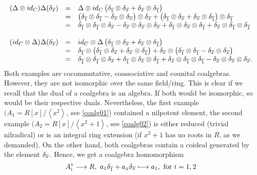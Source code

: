 $$\bao{rcl}
(\Delta \otimes id_C)\Delta(\delta_{\ov{x}}) &=& \Delta \otimes id_C\left(\delta_{\ov{1}} \otimes \delta_{\ov{x}} + \delta_{\ov{x}} \otimes \delta_{\ov{1}}\right)\\
&=& \left(\delta_{\ov{1}} \otimes \delta_{\ov{1}} - \delta_{\ov{x}} \otimes \delta_{\ov{x}}\right) \otimes \delta_{\ov{x}} + \left(\delta_{\ov{1}} \otimes \delta_{\ov{x}} + \delta_{\ov{x}} \otimes \delta_{\ov{1}}\right) \otimes \delta_{\ov{1}}\\
&=& \delta_{\ov{1}} \otimes \delta_{\ov{1}} \otimes \delta_{\ov{x}} - \delta_{\ov{x}} \otimes \delta_{\ov{x}}
\otimes \delta_{\ov{x}} + \delta_{\ov{1}} \otimes \delta_{\ov{x}} \otimes \delta_{\ov{1}} + \delta_{\ov{x}} \otimes \delta_{\ov{1}} \otimes \delta_{\ov{1}}\\
&&\\
(id_C \otimes \Delta)\Delta(\delta_{\ov{x}}) &=& id_C \otimes \Delta\left(\delta_{\ov{1}} \otimes \delta_{\ov{x}} + \delta_{\ov{x}} \otimes \delta_{\ov{1}}\right)\\
&=& \delta_{\ov{1}} \otimes \left(\delta_{\ov{1}} \otimes \delta_{\ov{x}} + \delta_{\ov{x}} \otimes \delta_{\ov{1}}\right) + \delta_{\ov{x}} \otimes \left(\delta_{\ov{1}} \otimes \delta_{\ov{1}} - \delta_{\ov{x}} \otimes \delta_{\ov{x}}\right)\\
&=& \delta_{\ov{1}} \otimes \delta_{\ov{1}} \otimes \delta_{\ov{x}} + \delta_{\ov{1}} \otimes \delta_{\ov{x}} \otimes \delta_{\ov{1}} + \delta_{\ov{x}} \otimes \delta_{\ov{1}} \otimes \delta_{\ov{1}} - \delta_{\ov{x}} \otimes \delta_{\ov{x}} \otimes \delta_{\ov{x}}.\\
\ea$$
\en
Both examples are cocommutative, coassociative and counital coalgebras. However, they are not isomorphic over the same field/ring. This is clear if we recall that the dual of a coalgebra is an algebra. If both would be isomorphic, so would be their respective duals. Nevertheless, the first example $(A_1 = R[x]/\left<x^2\right>$, see \ref{coalg01}) contained a nilpotent element, the second example $(A_2 = R[x]/\left<x^2 + 1\right>$, see \ref{coalg02}) is either reduced (trivial nilradical) or is an integral ring extension (if $x^2 + 1$ has no roots in $R$, as we demanded). On the other hand, both coalgebras contain a coideal generated by the element $\delta_{\ov{x}}$. Hence, we get a coalgebra homomorphism
$$A_i^* \longrightarrow R,\ a_1 \delta_{\ov{1}} + a_x \delta_{\ov{x}} \longmapsto a_1,\ \trm{for}\ i = 1,2$$
